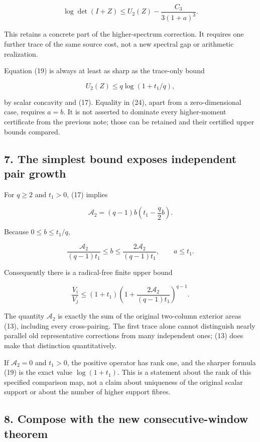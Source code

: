 \documentclass[
  11pt,
]{article}
\begin{document}
\[
 \boxed{\log\det(I+Z)
 \le U_2(Z)-\frac{C_3}{3(1+a)^3}.}                              \tag{23}
\]

This retains a concrete part of the higher-spectrum correction. It
requires one further trace of the same source cost, not a new spectral
gap or arithmetic realization.

Equation (19) is always at least as sharp as the trace-only bound

\[
 U_2(Z)\le q\log(1+t_1/q),                                     \tag{24}
\]

by scalar concavity and (17). Equality in (24), apart from a
zero-dimensional case, requires \(a=b\). It is not asserted to dominate
every higher-moment certificate from the previous note; those can be
retained and their certified upper bounds compared.

\subsection{7. The simplest bound exposes independent pair
growth}\label{the-simplest-bound-exposes-independent-pair-growth}

For \(q\ge2\) and \(t_1>0\), (17) implies

\[
 \mathcal A_2=(q-1)b\left(t_1-\frac q2b\right).
\]

Because \(0\le b\le t_1/q\),

\[
 \frac{\mathcal A_2}{(q-1)t_1}\le b
 \le\frac{2\mathcal A_2}{(q-1)t_1},\qquad a\le t_1.
\]

Consequently there is a radical-free finite upper bound

\[
 \boxed{
 \frac{V_i}{V_j}
 \le(1+t_1)
 \left(1+\frac{2\mathcal A_2}{(q-1)t_1}\right)^{q-1}.
 }                                                             \tag{25}
\]

The quantity \(\mathcal A_2\) is exactly the sum of the original
two-column exterior areas (13), including every cross-pairing. The first
trace alone cannot distinguish nearly parallel old representative
corrections from many independent ones; (13) does make that distinction
quantitatively.

If \(\mathcal A_2=0\) and \(t_1>0\), the positive operator has rank one,
and the sharper formula (19) is the exact value \(\log(1+t_1)\). This is
a statement about the rank of this specified comparison map, not a claim
about uniqueness of the original scalar support or about the number of
higher support fibres.

\subsection{8. Compose with the new consecutive-window
theorem}\label{compose-with-the-new-consecutive-window-theorem}
\end{document}
